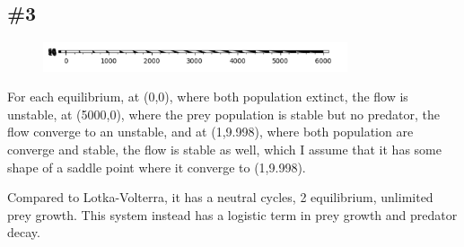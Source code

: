 \documentclass[12pt]{article}
\begin{document}
\subsection*{\#3}
\begin{figure}[htbp]
    \centering
    \includegraphics[width=0.8\textwidth]{Hw7.png}
\end{figure}

For each equilibrium, at (0,0), where both population extinct, the flow is unstable, at (5000,0), where the prey population is stable but no predator, the flow converge to an unstable, and at (1,9.998), where both population are converge and stable, the flow is stable as well, which I assume that it has some shape of a saddle point where it converge to (1,9.998).

Compared to Lotka-Volterra, it has a neutral cycles, 2 equilibrium, unlimited prey growth. This system instead has a logistic term in prey growth and predator decay.
\end{document}
